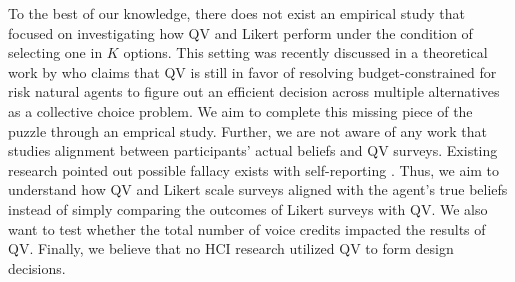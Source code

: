 To the best of our knowledge,
there does not exist an empirical study 
that focused on investigating
how QV and Likert perform
under the condition of selecting
one in $K$ options.
This setting was recently discussed 
in a theoretical work by \textcite{eguia2019quadratic}
who claims that QV is still in favor 
of resolving budget-constrained 
for risk natural agents
to figure out an efficient decision 
across multiple alternatives
as a collective choice problem.
We aim to complete this missing piece of the puzzle 
through an emprical study.
Further,
we are not aware of any work
that studies alignment between
participants' actual beliefs
and QV surveys.
Existing research pointed out 
possible fallacy exists with self-reporting
\cite{araujo2017much, vavreck2007exaggerated}.
Thus, we aim to understand
how QV and Likert scale surveys
aligned with the agent's true beliefs
instead of simply comparing 
the outcomes of Likert surveys with QV.
We also want to test
whether the total number of voice credits 
impacted the results of QV.
Finally, we believe that
no HCI research utilized QV
to form design decisions.